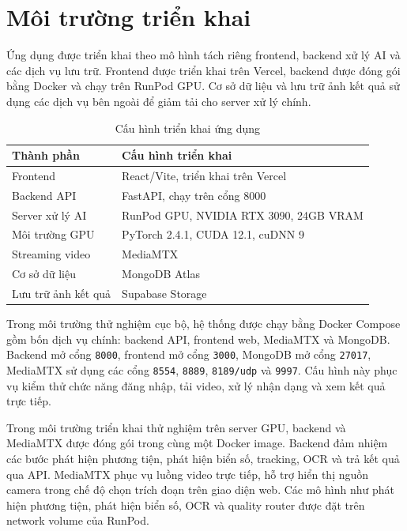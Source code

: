 \documentclass[../DoAn.tex]{subfiles}
\begin{document}
\section{Môi trường triển khai}
\label{section:4.4}

Ứng dụng được triển khai theo mô hình tách riêng frontend, backend xử lý AI và các dịch vụ lưu trữ. Frontend được triển khai trên Vercel, backend được đóng gói bằng Docker và chạy trên RunPod GPU. Cơ sở dữ liệu và lưu trữ ảnh kết quả sử dụng các dịch vụ bên ngoài để giảm tải cho server xử lý chính.

\begin{table}[htbp]
\centering
\begin{tabular}{p{4cm} p{10cm}}
\hline
\textbf{Thành phần} & \textbf{Cấu hình triển khai} \\ \hline
Frontend & React/Vite, triển khai trên Vercel \\ \hline
Backend API & FastAPI, chạy trên cổng 8000 \\ \hline
Server xử lý AI & RunPod GPU, NVIDIA RTX 3090, 24GB VRAM \\ \hline
Môi trường GPU & PyTorch 2.4.1, CUDA 12.1, cuDNN 9 \\ \hline
Streaming video & MediaMTX \\ \hline
Cơ sở dữ liệu & MongoDB Atlas \\ \hline
Lưu trữ ảnh kết quả & Supabase Storage \\ \hline
\end{tabular}
\caption{Cấu hình triển khai ứng dụng}
\label{table:deployment_config}
\end{table}

Trong môi trường thử nghiệm cục bộ, hệ thống được chạy bằng Docker Compose gồm bốn dịch vụ chính: backend API, frontend web, MediaMTX và MongoDB. Backend mở cổng \texttt{8000}, frontend mở cổng \texttt{3000}, MongoDB mở cổng \texttt{27017}, MediaMTX sử dụng các cổng \texttt{8554}, \texttt{8889}, \texttt{8189/udp} và \texttt{9997}. Cấu hình này phục vụ kiểm thử chức năng đăng nhập, tải video, xử lý nhận dạng và xem kết quả trực tiếp.

Trong môi trường triển khai thử nghiệm trên server GPU, backend và MediaMTX được đóng gói trong cùng một Docker image. Backend đảm nhiệm các bước phát hiện phương tiện, phát hiện biển số, tracking, OCR và trả kết quả qua API. MediaMTX phục vụ luồng video trực tiếp, hỗ trợ hiển thị nguồn camera trong chế độ chọn trích đoạn trên giao diện web. Các mô hình như phát hiện phương tiện, phát hiện biển số, OCR và quality router được đặt trên network volume của RunPod.
\end{document}
